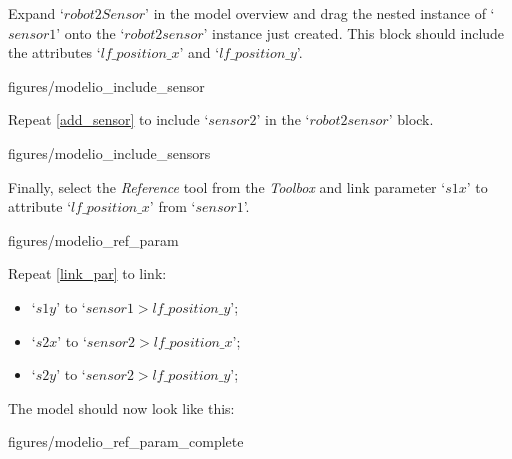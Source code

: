 \documentclass[11pt,a4paper]{../tutorial}
\begin{document}
\begin{instructions}
\newpage

\item \label{add_sensor} Expand `$robot2Sensor$' in the model overview and drag the nested instance of `$sensor1$' onto the `$robot2sensor$' instance just created. This block should include the attributes `$lf\_position\_x$' and `$lf\_position\_y$'.

\begin{center}
\begin{annotation}[width=0.7\linewidth]{figures/modelio_include_sensor}
    \end{annotation}
\end{center}

\item Repeat \ref{add_sensor} to include `$sensor2$' in the `$robot2sensor$' block.

\begin{center}
\begin{annotation}[width=0.7\linewidth]{figures/modelio_include_sensors}
    \end{annotation}
\end{center}

\item \label{link_par} Finally, select the \emph{Reference} tool from the \emph{Toolbox} and link parameter `$s1x$' to attribute `$lf\_position\_x$' from `$sensor1$'.

\begin{center}
\begin{annotation}[width=0.7\linewidth]{figures/modelio_ref_param}
    \end{annotation}
\end{center}

\newpage

\item Repeat \ref{link_par} to link:
\begin{itemize}
	\item `$s1y$' to `$sensor1 > lf\_position\_y$';
	\item `$s2x$' to `$sensor2 > lf\_position\_x$';
	\item `$s2y$' to `$sensor2 > lf\_position\_y$';
\end{itemize}

The model should now look like this:

\begin{center}
\begin{annotation}[width=0.7\linewidth]{figures/modelio_ref_param_complete}
    \end{annotation}
\end{center}

\end{instructions}
\end{document}
